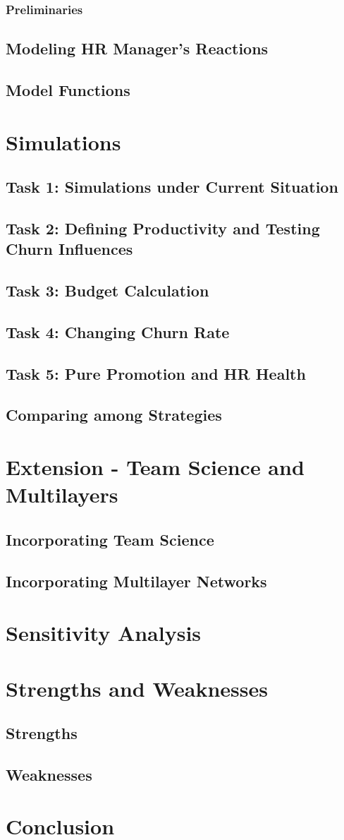 \documentclass[10pt]{article}
\begin{document}
  \subsubsection{Preliminaries}


  \subsection{Modeling HR Manager’s Reactions}
  \subsection{Model Functions}
  \section{Simulations}
  \subsection{Task 1: Simulations under Current Situation}
  \subsection{Task 2: Defining Productivity and Testing Churn Influences}
  \subsection{Task 3: Budget Calculation}
  \subsection{Task 4: Changing Churn Rate}
  \subsection{Task 5: Pure Promotion and HR Health}
  \subsection{Comparing among Strategies}
  \section{Extension - Team Science and Multilayers}
  \subsection{Incorporating Team Science}
  \subsection{Incorporating Multilayer Networks}
  \section{Sensitivity Analysis}
  \section{Strengths and Weaknesses}
  \subsection{Strengths}
  \subsection{Weaknesses}
  \section{Conclusion}
\end{document}
